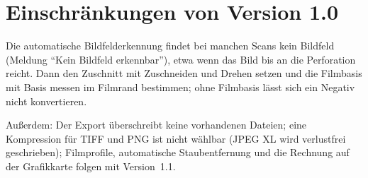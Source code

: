 \documentclass[a4paper,11pt,parskip=half,DIV=12]{scrartcl}
\newcommand{\menu}[1]{\textsf{#1}}                    %
\begin{document}
\section{Einschränkungen von Version 1.0}

Die automatische Bildfelderkennung findet bei manchen Scans kein Bildfeld (Meldung
\enquote{Kein Bildfeld erkennbar}), etwa wenn das Bild bis an die Perforation reicht. Dann den
Zuschnitt mit \menu{Zuschneiden und Drehen} setzen und die Filmbasis mit \menu{Basis messen}
im Filmrand bestimmen; ohne Filmbasis lässt sich ein Negativ nicht konvertieren.

Außerdem: Der Export überschreibt keine vorhandenen Dateien; eine Kompression für TIFF und PNG ist nicht wählbar (JPEG XL wird
verlustfrei geschrieben); Filmprofile, automatische Staubentfernung und die Rechnung auf der
Grafikkarte folgen mit Version~1.1.
\end{document}
